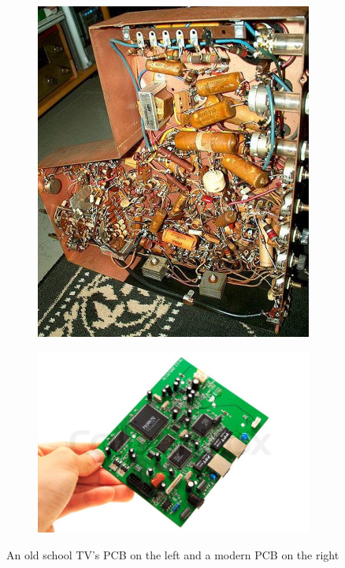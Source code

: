 \documentclass[final]{cubedoc}
\begin{document}
	\begin{figure}[h!]
		\centering
		\begin{subfigure}{.5\textwidth}
			\centering
			\includegraphics[height=0.25\textheight, width=.8\textwidth]{assets/old_school_TV_PCB.jpg}
			\label{fig:sub1}
		\end{subfigure}%
		\begin{subfigure}{.5\textwidth}
			\centering
			\includegraphics[height=0.25\textheight, width=.8\textwidth]{assets/modern_PCB.jpg}
			\label{fig:sub2}
		\end{subfigure}
		\caption{An old school TV's PCB on the left and a modern PCB on the right}
		\label{fig:test}
	\end{figure}
	
\end{document}
